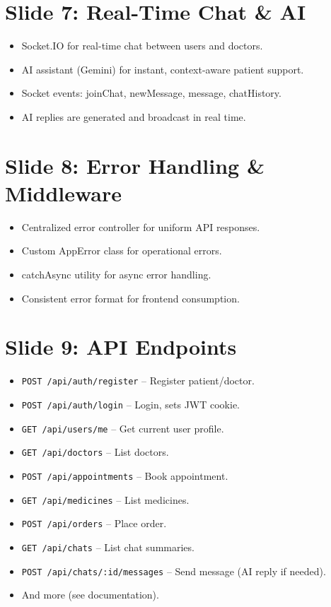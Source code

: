 \documentclass[12pt]{article}
\begin{document}

\section*{Slide 7: Real-Time Chat \& AI}
\begin{itemize}[leftmargin=1cm]
    \item Socket.IO for real-time chat between users and doctors.
    \item AI assistant (Gemini) for instant, context-aware patient support.
    \item Socket events: joinChat, newMessage, message, chatHistory.
    \item AI replies are generated and broadcast in real time.
\end{itemize}


\section*{Slide 8: Error Handling \& Middleware}
\begin{itemize}[leftmargin=1cm]
    \item Centralized error controller for uniform API responses.
    \item Custom AppError class for operational errors.
    \item catchAsync utility for async error handling.
    \item Consistent error format for frontend consumption.
\end{itemize}


\section*{Slide 9: API Endpoints}
\begin{itemize}[leftmargin=1cm]
    \item \texttt{POST /api/auth/register} -- Register patient/doctor.
    \item \texttt{POST /api/auth/login} -- Login, sets JWT cookie.
    \item \texttt{GET /api/users/me} -- Get current user profile.
    \item \texttt{GET /api/doctors} -- List doctors.
    \item \texttt{POST /api/appointments} -- Book appointment.
    \item \texttt{GET /api/medicines} -- List medicines.
    \item \texttt{POST /api/orders} -- Place order.
    \item \texttt{GET /api/chats} -- List chat summaries.
    \item \texttt{POST /api/chats/:id/messages} -- Send message (AI reply if needed).
    \item And more (see documentation).
\end{itemize}
\end{document}
